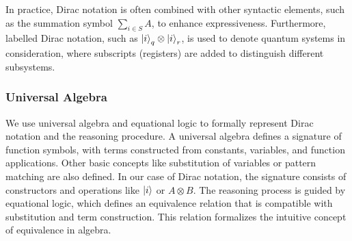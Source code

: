 In practice, Dirac notation is often combined with other syntactic elements, such as the summation symbol \( \sum_{i \in S} A \), to enhance expressiveness. Furthermore, labelled Dirac notation, such as \( \ket{i}_q \otimes \ket{i}_r \), is used to denote quantum systems in consideration, where subscripts (registers) are added to distinguish different subsystems.

\subsubsection{Universal Algebra}
We use universal algebra and equational logic to formally represent Dirac notation and the reasoning procedure. A universal algebra defines a signature of function symbols, with terms constructed from constants, variables, and function applications. 
Other basic concepts like substitution of variables or pattern matching are also defined.
In our case of Dirac notation, the signature consists of constructors and operations like $\ket{i}$ or $A \otimes B$.
The reasoning process is guided by equational logic, which defines an equivalence relation that is compatible with substitution and term construction. This relation formalizes the intuitive concept of equivalence in algebra.

